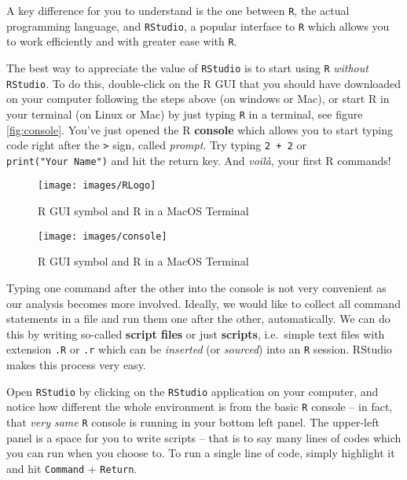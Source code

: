 \documentclass[]{book}
\begin{document}
A key difference for you to understand is the one between \texttt{R}, the actual programming language, and \texttt{RStudio}, a popular interface to \texttt{R} which allows you to work efficiently and with greater ease with \texttt{R}.

The best way to appreciate the value of \texttt{RStudio} is to start using \texttt{R} \emph{without} \texttt{RStudio}. To do this, double-click on the R GUI that you should have downloaded on your computer following the steps above (on windows or Mac), or start R in your terminal (on Linux or Mac) by just typing \texttt{R} in a terminal, see figure \ref{fig:console}. You've just opened the R \textbf{console} which allows you to start typing code right after the \texttt{\textgreater{}} sign, called \emph{prompt}. Try typing \texttt{2\ +\ 2} or \texttt{print("Your\ Name")} and hit the return key. And \emph{voilà}, your first R commands!

\begin{figure}

{\centering \texttt{[image: images/RLogo]} 

}

\caption{R GUI symbol and R in a MacOS Terminal}\label{fig:console-1}
\end{figure}
\begin{figure}

{\centering \texttt{[image: images/console]} 

}

\caption{R GUI symbol and R in a MacOS Terminal}\label{fig:console-2}
\end{figure}

Typing one command after the other into the console is not very convenient as our analysis becomes more involved. Ideally, we would like to collect all command statements in a file and run them one after the other, automatically. We can do this by writing so-called \textbf{script files} or just \textbf{scripts}, i.e.~simple text files with extension \texttt{.R} or \texttt{.r} which can be \emph{inserted} (or \emph{sourced}) into an \texttt{R} session. RStudio makes this process very easy.

Open \texttt{RStudio} by clicking on the \texttt{RStudio} application on your computer, and notice how different the whole environment is from the basic \texttt{R} console -- in fact, that \emph{very same} \texttt{R} console is running in your bottom left panel. The upper-left panel is a space for you to write scripts -- that is to say many lines of codes which you can run when you choose to. To run a single line of code, simply highlight it and hit \texttt{Command} + \texttt{Return}.
\end{document}
